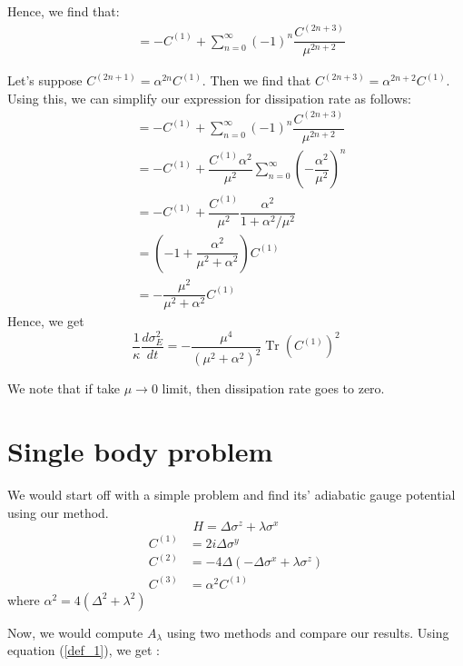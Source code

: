 \documentclass[11pt,a4paper]{article}
\DeclareMathOperator{\Tr}{Tr}
\begin{document}
Hence, we find that:
\begin{align}
[G_{\lambda}(A_{\lambda} (\mu)), H] &= - C^{(1)} +  \sum_{n=0}^{\infty}   (-1)^{n}   \dfrac{ C^{(2n+3)}}{\mu^{2n+2}}
\end{align}

Let's suppose $C^{(2n+1)}= \alpha^{2n} C^{(1)}$. Then we find that $C^{(2n+3)}= \alpha^{2n+2} C^{(1)} $. Using this, we can simplify our expression for dissipation rate as follows:
\begin{align}
 [G_{\lambda}(A_{\lambda} (\mu)), H]&=  - C^{(1)} +  \sum_{n=0}^{\infty}   (-1)^{n}   \dfrac{ C^{(2n+3)}}{\mu^{2n+2}}\\
&=  - C^{(1)} +    \dfrac{ C^{(1)}\alpha^2 }{\mu^{2}} \sum_{n=0}^{\infty}   \left(  - \dfrac{ \alpha^{2} }{\mu^{2}}\right)^n \\
&=  - C^{(1)} +    \dfrac{ C^{(1)} }{\mu^{2}} \dfrac{ \alpha^2  }{1 + \alpha^2 / \mu^{2}} \\
&= \left(- 1 +    \dfrac{\alpha^2  }{   \mu^{2}+ \alpha^2 } \right) C^{(1)} \\
&=-\dfrac{\mu^{2} }{   \mu^{2}+ \alpha^2 }  C^{(1)}
\end{align}
Hence, we get 
\begin{equation}
\boxed{\dfrac{1}{ \kappa } \dfrac{d \sigma^2_E}{ dt}= -\dfrac{\mu^{4} }{   (\mu^{2}+ \alpha^2)^2 } \Tr (C^{(1)})^2}
\end{equation}

We note that if take $\mu \rightarrow 0$ limit, then dissipation rate goes to zero.



\section{Single body problem}
We would start off with a simple problem and find its' adiabatic gauge potential using our method.
\begin{equation}
H= \Delta \sigma^z + \lambda \sigma^x
\end{equation}
\begin{align}
C^{(1)} &= 2 i \Delta \sigma^y \\
C^{(2)} &= - 4  \Delta ( -  \Delta \sigma^x + \lambda \sigma^z) \\
C^{(3)} &= \alpha^2 C^{(1)} 
\end{align}
where $\alpha^2 = 4 (\Delta^2 + \lambda^2) $


Now, we would compute $A_{\lambda}$ using two methods and compare our results. Using equation (\ref{def_1}), we get :
\end{document}
